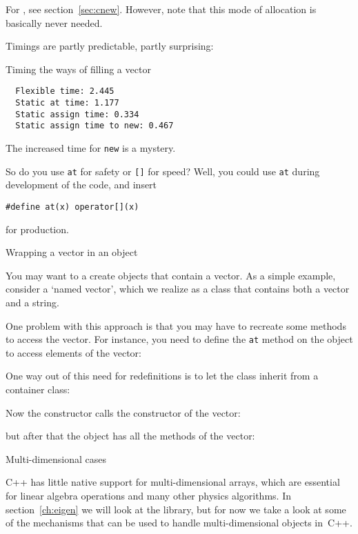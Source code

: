 For , see section~\ref{sec:cnew}. However, note that
this mode of allocation is basically never needed.

Timings are partly predictable, partly surprising:
\begin{block}{Timing the ways of filling a vector}
  \label{sl:vector-extend-time}
\begin{lstlisting}
  Flexible time: 2.445
  Static at time: 1.177
  Static assign time: 0.334
  Static assign time to new: 0.467
\end{lstlisting}
\end{block}

The increased time for \lstinline{new} is a mystery.

So do you use \lstinline{at} for safety or \lstinline{[]} for speed? Well, you could
use \lstinline{at} during development of the code, and insert
\begin{lstlisting}
#define at(x) operator[](x)
\end{lstlisting}
for production.

 {Wrapping a vector in an object}

You may want to a create objects that contain a vector.
As a simple example, consider a `named vector',
which we realize as a class that contains both a vector and a string.
%

One problem with this approach is that
you may have to recreate some methods to access the vector.
For instance, you need to define the \lstinline{at} method
on the object to access elements of the vector:
%

One way out of this need for redefinitions
is to let the class inherit from a container class:
%

Now the constructor calls the constructor of the vector:
%

but after that the object has all the methods of the vector:
%


 {Multi-dimensional cases}

C++ has little native support for multi-dimensional arrays,
which are essential for linear algebra operations
and many other physics algorithms.
In section~\ref{ch:eigen} we will look at the 
library, but for now we take a look at some of the mechanisms that
can be used to handle multi-dimensional objects in~C++.

